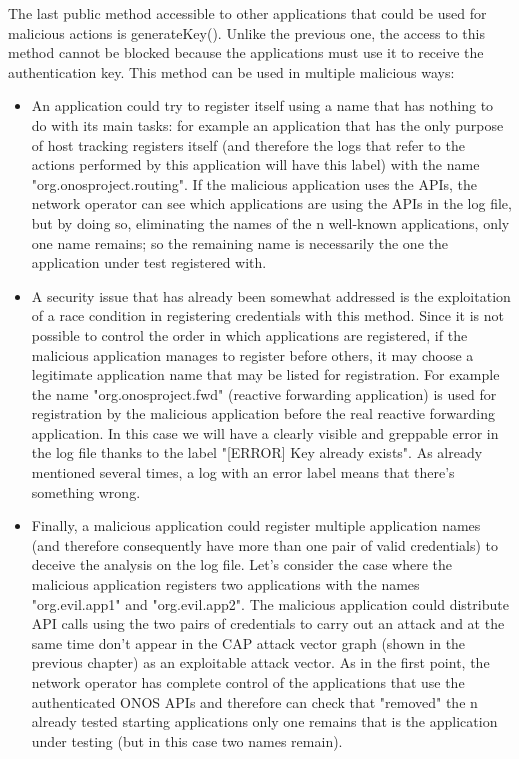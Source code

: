 The last public method accessible to other applications that could be used for malicious actions is generateKey(). Unlike the previous one, the access to this method cannot be blocked because the applications must use it to receive the authentication key.
This method can be used in multiple malicious ways:
\begin{itemize}
    \item An application could try to register itself using a name that has nothing to do with its main tasks: for example an application that has the only purpose of host tracking registers itself (and therefore the logs that refer to the actions performed by this application will have this label) with the name "org.onosproject.routing". If the malicious application uses the APIs, the network operator can see which applications are using the APIs in the log file, but by doing so, eliminating the names of the n well-known applications, only one name remains; so the remaining name is necessarily the one the application under test registered with.
    \item A security issue that has already been somewhat addressed is the exploitation of a race condition in registering credentials with this method. Since it is not possible to control the order in which applications are registered, if the malicious application manages to register before others, it may choose a legitimate application name that may be listed for registration. For example the name "org.onosproject.fwd" (reactive forwarding application) is used for registration by the malicious application before the real reactive forwarding application. In this case we will have a clearly visible and greppable error in the log file thanks to the label "[ERROR] Key already exists". As already mentioned several times, a log with an error label means that there's something wrong.
    \item Finally, a malicious application could register multiple application names (and therefore consequently have more than one pair of valid credentials) to deceive the analysis on the log file. Let's consider the case where the malicious application registers two applications with the names "org.evil.app1" and "org.evil.app2". The malicious application could distribute API calls using the two pairs of credentials to carry out an attack and at the same time don't appear in the CAP attack vector graph (shown in the previous chapter) as an exploitable attack vector. As in the first point, the network operator has complete control of the applications that use the authenticated ONOS APIs and therefore can check that "removed" the n already tested starting applications only one remains that is the application under testing (but in this case two names remain).
\end{itemize}

